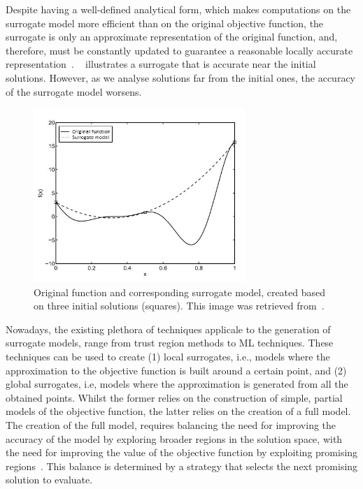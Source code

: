 	Despite having a well-defined analytical form, which makes computations on the surrogate model more efficient than on the original objective function, the surrogate is only an approximate representation of the original function, and, therefore, must be constantly updated to guarantee a reasonable locally accurate representation~\cite{Koziel2011}. ~ illustrates a surrogate that is accurate near the initial solutions. However, as we analyse solutions far from the initial ones, the accuracy of the surrogate model worsens.
	
	\begin{figure}
	\centering
	\includegraphics[width=8cm]{Images/Background/sbosexample.JPG}
	\caption{Original function and corresponding surrogate model, created based on three initial solutions (squares). This image was retrieved from~\cite{Koziel2011}.}
	\label{fig:sbosexample}
	\end{figure}
	
	Nowadays, the existing plethora of techniques applicale to the generation of surrogate models, range from trust region methods to \ac{ML} techniques. These techniques can be used to create (1) local surrogates, i.e., models where the approximation to the objective function is built around a certain point, and (2) global surrogates, i.e, models where the approximation is generated from all the obtained points. Whilst the former relies on the construction of simple, partial models of the objective function, the latter relies on the creation of a full model. The creation of the full model, requires balancing the need for improving the accuracy of the model by exploring broader regions in the solution space, with the need for improving the value of the objective function by exploiting promising regions~\cite{Koziel2011}. This balance is determined by a strategy that selects the next promising solution to evaluate.
	
